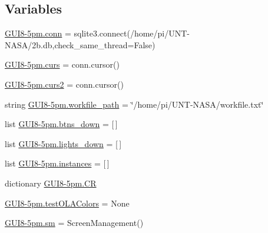 \subsection*{Variables}
\begin{DoxyCompactItemize}
\item 
\hyperlink{namespaceGUI8-5pm_a754cc5d2663b1ceb611c13b8e4ec91ad}{G\+U\+I8-\/5pm.\+conn} = sqlite3.\+connect(\textquotesingle{}/home/pi/U\+NT-\/N\+A\+SA/2b.\+db\textquotesingle{},check\+\_\+same\+\_\+thread=\+False)
\item 
\hyperlink{namespaceGUI8-5pm_adfad6340169cdc0fa55a47953d6320a0}{G\+U\+I8-\/5pm.\+curs} = conn.\+cursor()
\item 
\hyperlink{namespaceGUI8-5pm_acbb42dfb89c49147b15b0355fa744c45}{G\+U\+I8-\/5pm.\+curs2} = conn.\+cursor()
\item 
string \hyperlink{namespaceGUI8-5pm_a508b4e6132ee7dc30a64d3138ca931f1}{G\+U\+I8-\/5pm.\+workfile\+\_\+path} = \char`\"{}/home/pi/U\+NT-\/N\+A\+SA/workfile.\+txt\char`\"{}
\item 
list \hyperlink{namespaceGUI8-5pm_a90613e2e5dbe99c084c15b8d8d7d83fa}{G\+U\+I8-\/5pm.\+btns\+\_\+down} = \mbox{[}$\,$\mbox{]}
\item 
list \hyperlink{namespaceGUI8-5pm_a2d5665b7141552d71c310888d41efbd7}{G\+U\+I8-\/5pm.\+lights\+\_\+down} = \mbox{[}$\,$\mbox{]}
\item 
list \hyperlink{namespaceGUI8-5pm_ac6f3b5abf90a01b9e7266f0ebbc1b5e8}{G\+U\+I8-\/5pm.\+instances} = \mbox{[}$\,$\mbox{]}
\item 
dictionary \hyperlink{namespaceGUI8-5pm_a14d7ab1cf4721110f93f3f0b29286697}{G\+U\+I8-\/5pm.\+CR}
\item 
\hyperlink{namespaceGUI8-5pm_ab68e1f0d94f4a00210276fed699faaf7}{G\+U\+I8-\/5pm.\+test\+O\+L\+A\+Colors} = None
\item 
\hyperlink{namespaceGUI8-5pm_a6e831d571cc3bc2fd29a3c47972ede7d}{G\+U\+I8-\/5pm.\+sm} = Screen\+Management()
\end{DoxyCompactItemize}
